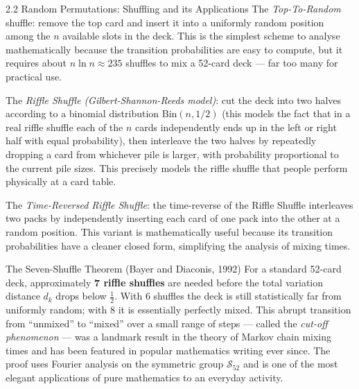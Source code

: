 \documentclass[aspectratio=169,10pt]{beamer}
\begin{document}
\begin{frame}[allowframebreaks]{2.2 Random Permutations: Shuffling and its Applications}
The \emph{Top-To-Random} shuffle: remove the top card and insert it into a
uniformly random position among the $n$ available slots in the deck.  This is
the simplest scheme to analyse mathematically because the transition
probabilities are easy to compute, but it requires about $n \ln n \approx 235$
shuffles to mix a 52-card deck --- far too many for practical use.

The \emph{Riffle Shuffle (Gilbert-Shannon-Reeds model)}: cut the deck into two
halves according to a binomial distribution $\mathrm{Bin}(n, 1/2)$ (this
models the fact that in a real riffle shuffle each of the $n$ cards
independently ends up in the left or right half with equal probability), then
interleave the two halves by repeatedly dropping a card from whichever pile is
larger, with probability proportional to the current pile sizes.  This
precisely models the riffle shuffle that people perform physically at a card
table.

The \emph{Time-Reversed Riffle Shuffle}: the time-reverse of the Riffle
Shuffle interleaves two packs by independently inserting each card of one pack
into the other at a random position.  This variant is mathematically useful
because its transition probabilities have a cleaner closed form, simplifying
the analysis of mixing times.

\begin{alertblock}{The Seven-Shuffle Theorem (Bayer and Diaconis, 1992)}
For a standard 52-card deck, approximately \textbf{7 riffle shuffles} are
needed before the total variation distance $d_k$ drops below $\tfrac{1}{2}$.
With 6 shuffles the deck is still statistically far from uniformly random; with
8 it is essentially perfectly mixed.  This abrupt transition from ``unmixed''
to ``mixed'' over a small range of steps --- called the \emph{cut-off
phenomenon} --- was a landmark result in the theory of Markov chain mixing
times and has been featured in popular mathematics writing ever since.  The
proof uses Fourier analysis on the symmetric group $\mathcal{S}_{52}$ and is
one of the most elegant applications of pure mathematics to an everyday activity.
\end{alertblock}

\end{frame}
\end{document}
